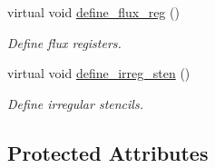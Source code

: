 \begin{DoxyCompactItemize}
virtual void \hyperlink{classamr__mesh_aebed5a1647255e6f5132ce6346fd3b59}{define\+\_\+flux\+\_\+reg} ()
\begin{DoxyCompactList}\small\item\em Define flux registers. \end{DoxyCompactList}\item 
virtual void \hyperlink{classamr__mesh_a59d1e4cbb4dd4934dda5e4e183e71e4b}{define\+\_\+irreg\+\_\+sten} ()
\begin{DoxyCompactList}\small\item\em Define irregular stencils. \end{DoxyCompactList}\end{DoxyCompactItemize}
\subsection*{Protected Attributes}
